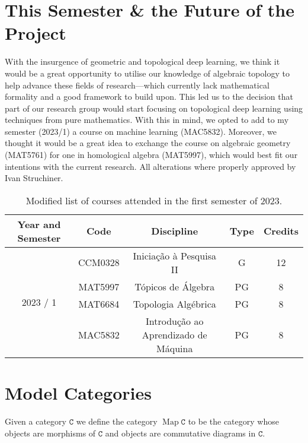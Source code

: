 \documentclass[11pt, reqno]{amsart}
\theoremstyle{definition}
\newcommand{\cat}{\texttt}
\DeclareMathOperator{\Map}{Map}
\begin{document}
\section{This Semester \&  the Future of the Project}

With the insurgence of geometric and topological deep learning, we think it
would be a great opportunity to utilise our knowledge of algebraic topology to
help advance these fields of research---which currently lack mathematical
formality and a good framework to build upon. This led us to the decision that
part of our research group would start focusing on topological deep learning
using techniques from pure mathematics. With this in mind, we opted to add to my
semester (2023/1) a course on machine learning (MAC5832). Moreover, we thought
it would be a great idea to exchange the course on algebraic geometry (MAT5761)
for one in homological algebra (MAT5997), which would best fit our intentions
with the current research. All alterations where properly approved by Ivan
Struchiner.

\begin{table}[h!]\label{tab:disc}
  \centering
  \caption{Modified list of courses attended in the first semester of 2023.}
  \begin{tabular}{ |c|c|c|c|c| }
    \hline
    Year and Semester & Code & Discipline & Type & Credits \\
    \hline
    \multirow{4}{*}{2023 / 1}
                   & CCM0328 & Iniciação à Pesquisa II            & G  & 12 \\
                   & MAT5997 & Tópicos de Álgebra   & PG & 8 \\
                   & MAT6684 & Topologia Algébrica                & PG & 8 \\
                   & MAC5832 & Introdução ao Aprendizado de Máquina & PG & 8 \\
    \hline
\end{tabular}
\end{table}

\section{Model Categories}

Given a category \(\cat C\) we define the category \(\Map \cat C\) to be the
category whose objects are morphisms of \(\cat C\) and objects are commutative
diagrams in \(\cat C\).
\end{document}
